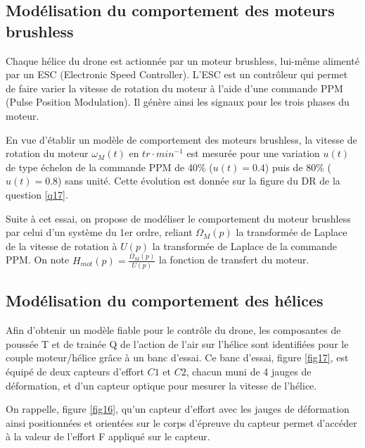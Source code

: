 \subsection{Modélisation du comportement des moteurs brushless}

Chaque hélice du drone est actionnée par un moteur brushless, lui-même alimenté par un ESC (Electronic Speed Controller). L'ESC est un contrôleur qui permet de faire varier la vitesse de rotation du moteur à l'aide d'une commande PPM (Pulse Position Modulation). Il génère ainsi les signaux pour les trois phases du moteur.

En vue d'établir un modèle de comportement des moteurs brushless, la vitesse de rotation du moteur $\omega_M(t)$ en $tr\cdot min^{-1}$ est mesurée pour une variation $u(t)$ de type échelon de la commande PPM de 40\% ($u(t)=0.4$) puis de 80\% ($u(t)=0.8$) sans unité. Cette évolution est donnée sur la figure du DR de la question \ref{q17}. 

Suite à cet essai, on propose de modéliser le comportement du moteur brushless par celui d'un système du 1er ordre, reliant $\Omega_M(p)$ la transformée de Laplace de la vitesse de rotation à $U(p)$ la transformée de Laplace de la commande PPM. On note $H_{mot}(p)=\frac{\Omega_M(p)}{U(p)}$ la fonction
de transfert du moteur.


\subsection{Modélisation du comportement des hélices}

Afin d'obtenir un modèle fiable pour le contrôle du drone, les composantes de poussée T et de trainée Q de l'action de l'air sur l'hélice sont identifiées pour le couple moteur/hélice grâce à un banc d'essai. Ce banc d'essai, figure \ref{fig17}, est équipé de deux capteurs d'effort $C1$ et $C2$, chacun muni de 4 jauges de déformation, et d'un capteur optique pour mesurer la vitesse de l'hélice.

On rappelle, figure \ref{fig16}, qu'un capteur d'effort avec les jauges de déformation ainsi positionnées et orientées sur le corps d'épreuve du capteur permet d'accéder à la valeur de l'effort F appliqué sur le capteur.

